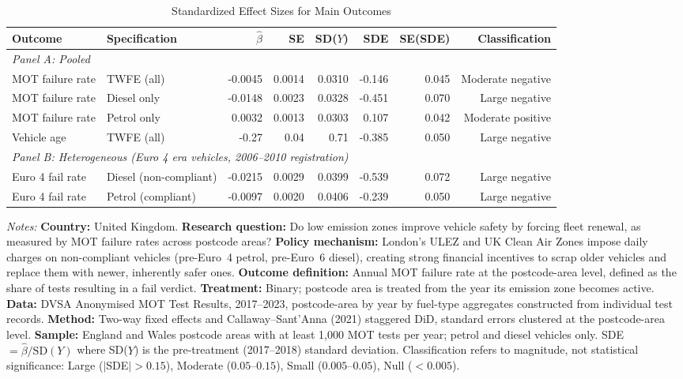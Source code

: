 \begin{table}[H]
\centering
\caption{Standardized Effect Sizes for Main Outcomes}
\label{tab:sde}
\begin{threeparttable}
\scriptsize
\begin{tabular}{llrrrrrr}
\toprule
Outcome & Specification & $\hat{\beta}$ & SE & SD($Y$) & SDE & SE(SDE) & Classification \\
\midrule
\multicolumn{8}{l}{\textit{Panel A: Pooled}} \\
MOT failure rate & TWFE (all) & -0.0045 & 0.0014 & 0.0310 & -0.146 & 0.045 & Moderate negative \\
MOT failure rate & Diesel only & -0.0148 & 0.0023 & 0.0328 & -0.451 & 0.070 & Large negative \\
MOT failure rate & Petrol only & 0.0032 & 0.0013 & 0.0303 & 0.107 & 0.042 & Moderate positive \\
Vehicle age & TWFE (all) & -0.27 & 0.04 & 0.71 & -0.385 & 0.050 & Large negative \\
\midrule
\multicolumn{8}{l}{\textit{Panel B: Heterogeneous (Euro 4 era vehicles, 2006--2010 registration)}} \\
Euro 4 fail rate & Diesel (non-compliant) & -0.0215 & 0.0029 & 0.0399 & -0.539 & 0.072 & Large negative \\
Euro 4 fail rate & Petrol (compliant) & -0.0097 & 0.0020 & 0.0406 & -0.239 & 0.050 & Large negative \\
\bottomrule
\end{tabular}
\begin{tablenotes}[flushleft]
\footnotesize
\item \textit{Notes:}
\textbf{Country:} United Kingdom.
\textbf{Research question:} Do low emission zones improve vehicle safety by forcing fleet renewal, as measured by MOT failure rates across postcode areas?
\textbf{Policy mechanism:} London's ULEZ and UK Clean Air Zones impose daily charges on non-compliant vehicles (pre-Euro~4 petrol, pre-Euro~6 diesel), creating strong financial incentives to scrap older vehicles and replace them with newer, inherently safer ones.
\textbf{Outcome definition:} Annual MOT failure rate at the postcode-area level, defined as the share of tests resulting in a fail verdict.
\textbf{Treatment:} Binary; postcode area is treated from the year its emission zone becomes active.
\textbf{Data:} DVSA Anonymised MOT Test Results, 2017--2023, postcode-area by year by fuel-type aggregates constructed from individual test records.
\textbf{Method:} Two-way fixed effects and Callaway--Sant'Anna (2021) staggered DiD, standard errors clustered at the postcode-area level.
\textbf{Sample:} England and Wales postcode areas with at least 1,000 MOT tests per year; petrol and diesel vehicles only.
SDE $= \hat{\beta} / \text{SD}(Y)$ where SD($Y$) is the pre-treatment (2017--2018) standard deviation.
Classification refers to magnitude, not statistical significance:
Large ($|$SDE$| > 0.15$), Moderate ($0.05$--$0.15$), Small ($0.005$--$0.05$), Null ($< 0.005$).
\end{tablenotes}
\end{threeparttable}
\end{table}
